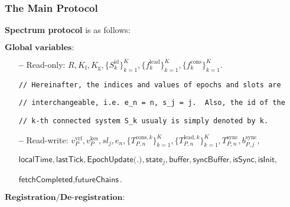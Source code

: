 \subsubsection{The Main Protocol}
\textbf{Spectrum protocol} is as follows:\label{apndx:spectrum-protocol}
\begin{protocol}
    \caption{$\textsf{Spectrum}(P, \text{sid}; \mathcal{G}_{\text{Ledger}}, \mathcal{G}_{\text{ImpLClock}}, \mathcal{H}, \mathcal{F}^{\Delta}_{\text{N-MC}})$}
    \begin{algorithmic}
        \State $\textbf{Global variables:}$
        \begin{itemize}
            \item[\textbf{--}] Read-only: $R, K_{\text{f}}, K_{\text{g}}, \{S_k^{\text{id}}\}_{k=1}^K, \{f^{\text{lead}}_k\}_{k=1}^K, \{f^{\text{cons}}_k\}_{k=1}^K$.
            \item[] \lstinline|// Hereinafter, the indices and values of epochs and slots are|
            \item[] \lstinline|// interchangeable, i.e. e_n = n, s_j = j.  Also, the id of the|
            \item[]  \lstinline|// k-th connected system S_k usualy is simply denoted by k.|
            \item[\textbf{--}] Read-write: $v^{\text{vrf}}_P, v^{\text{kes}}_P, sl_j, e_n, \{T^{\text{cons}, k}_{P, n}\}_{k=1}^K, \{T^{\text{lead}, k}_{P, n}\}_{k=1}^K, T^{\text{sync}}_{P, n}, b^{\text{sync}}_{P, j},$
            \item[] $\textsf{localTime}, \textsf{lastTick}, \textsf{EpochUpdate(.)}, \textsf{state}_{j}, \textsf{buffer}, \textsf{syncBuffer}, \textsf{isSync}, \textsf{isInit},$
            \item[] $\textsf{fetchCompleted}, \textsf{futureChains}$.
        \end{itemize}
        \State $\textbf{Registration/De-registration:}$


\end{algorithmic}
\end{protocol}
